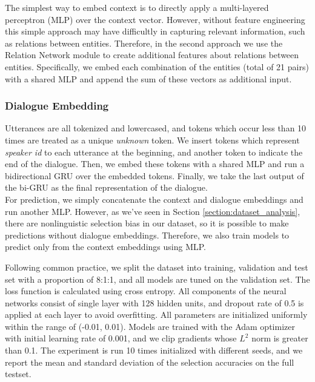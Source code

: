 \documentclass[letterpaper]{article} %
\begin{document}
The simplest way to embed context is to directly apply a multi-layered perceptron (MLP) over the context vector. However, without feature engineering this simple approach may have difficultly in capturing relevant information, such as relations between entities. Therefore, in the second approach we use the Relation Network module \cite{santoro2017simple} to create additional features about relations between entities. Specifically, we embed each combination of the entities (total of 21 pairs) with a shared MLP and append the sum of these vectors as additional input.

\subsubsection{Dialogue Embedding}

Utterances are all tokenized and lowercased, and tokens which occur less than 10 times are treated as a unique \emph{unknown} token. We insert tokens which represent \emph{speaker id} to each utterance at the beginning, and another token to indicate the end of the dialogue. Then, we embed these tokens with a shared MLP and run a bidirectional GRU \cite{cho2014properties} over the embedded tokens. Finally, we take the last output of the bi-GRU as the final representation of the dialogue. \\

For prediction, we simply concatenate the context and dialogue embeddings and run another MLP. However, as we've seen in Section \ref{section:dataset_analysis}, there are nonlinguistic selection bias in our dataset, so it is possible to make predictions without dialogue embeddings. Therefore, we also train models to predict only from the context embeddings using MLP.

Following common practice, we split the dataset into training, validation and test set with a proportion of 8:1:1, and all models are tuned on the validation set. The loss function is calculated using cross entropy. All components of the neural networks consist of single layer with 128 hidden units, and dropout rate of 0.5 is applied at each layer to avoid overfitting. All parameters are initialized uniformly within the range of (-0.01, 0.01). Models are trained with the Adam optimizer \cite{kingma2014adam} with initial learning rate of 0.001, and we clip gradients whose $L^2$ norm is greater than 0.1. The experiment is run 10 times initialized with different seeds, and we report the mean and standard deviation of the selection accuracies on the full testset.
\end{document}
